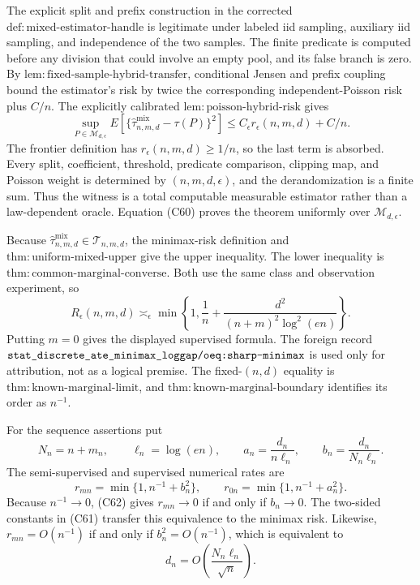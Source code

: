 The explicit split and prefix construction in the corrected \(\mathrm{def:mixed\mbox{-}estimator\mbox{-}handle}\) is legitimate under labeled iid sampling, auxiliary iid sampling, and independence of the two samples.  The finite predicate is computed before any division that could involve an empty pool, and its false branch is zero.  By \(\mathrm{lem:fixed\mbox{-}sample\mbox{-}hybrid\mbox{-}transfer}\), conditional Jensen and prefix coupling bound the estimator's risk by twice the corresponding independent-Poisson risk plus \(C/n\).  The explicitly calibrated \(\mathrm{lem:poisson\mbox{-}hybrid\mbox{-}risk}\) gives
\[
 \sup_{P\in\mathcal M_{d,\epsilon}}
 E[\{\widehat\tau^{\mathrm{mix}}_{n,m,d}-\tau(P)\}^2]
 \le C_\epsilon r_\epsilon(n,m,d)+C/n.                            \tag{C60}
\]
The frontier definition has \(r_\epsilon(n,m,d)\ge1/n\), so the last term is absorbed.  Every split, coefficient, threshold, predicate comparison, clipping map, and Poisson weight is determined by \((n,m,d,\epsilon)\), and the derandomization is a finite sum.  Thus the witness is a total computable measurable estimator rather than a law-dependent oracle.  Equation (C60) proves the theorem uniformly over \(\mathcal M_{d,\epsilon}\).

Because \(\widehat\tau^{\mathrm{mix}}_{n,m,d}\in\mathcal T_{n,m,d}\), the minimax-risk definition and \(\mathrm{thm:uniform\mbox{-}mixed\mbox{-}upper}\) give the upper inequality.  The lower inequality is \(\mathrm{thm:common\mbox{-}marginal\mbox{-}converse}\).  Both use the same class and observation experiment, so
\[
 R_\epsilon(n,m,d)\asymp_\epsilon
 \min\!\left\{1,\frac1n+\frac{d^2}{(n+m)^2\log^2(en)}\right\}.      \tag{C61}
\]
Putting \(m=0\) gives the displayed supervised formula.  The foreign record \(\texttt{stat\_discrete\_ate\_minimax\_loggap/oeq:sharp\mbox{-}minimax}\) is used only for attribution, not as a logical premise.  The fixed-\((n,d)\) equality is \(\mathrm{thm:known\mbox{-}marginal\mbox{-}limit}\), and \(\mathrm{thm:known\mbox{-}marginal\mbox{-}boundary}\) identifies its order as \(n^{-1}\).

For the sequence assertions put
\[
 N_n=n+m_n,\qquad \ell_n=\log(en),\qquad
 a_n=\frac{d_n}{n\ell_n},\qquad b_n=\frac{d_n}{N_n\ell_n}.
\]
The semi-supervised and supervised numerical rates are
\[
 r_{mn}=\min\{1,n^{-1}+b_n^2\},\qquad
 r_{0n}=\min\{1,n^{-1}+a_n^2\}.                                   \tag{C62}
\]
Because \(n^{-1}\to0\), (C62) gives \(r_{mn}\to0\) if and only if \(b_n\to0\).  The two-sided constants in (C61) transfer this equivalence to the minimax risk.  Likewise, \(r_{mn}=O(n^{-1})\) if and only if \(b_n^2=O(n^{-1})\), which is equivalent to
\[
 d_n=O\!\left(\frac{N_n\ell_n}{\sqrt n}\right).                   \tag{C63}
\]

